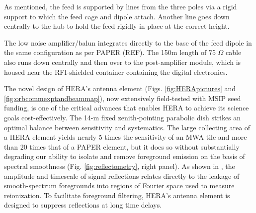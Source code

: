 \documentclass[preprint,11pt]{aastex}
\newcommand{\Mycitet}[1]{\citet{#1}}
\begin{document}
As mentioned, the feed is supported by lines from the three poles via a rigid support to which the feed cage and dipole attach.  Another line goes down centrally to the hub to hold the feed rigidly in place at the correct height.

The low noise amplifier/balun integrates directly to the base of the feed dipole in the same configuration as per PAPER (REF).  The 150m length of 75 $\Omega$ cable also runs down centrally and then over to the post-amplifier module, which is housed near the RFI-shielded container containing the digital electronics.



\noindent The novel design of HERA's antenna element (Figs. \ref{fig:HERApictures} and \ref{fig:orbcommexptandbeammap}), now extensively field-tested with MSIP seed funding, 
is one of the critical advances that enables HERA to achieve its science
goals cost-effectively.  The 14-m fixed zenith-pointing parabolic dish strikes an optimal
balance between sensitivity and systematics.  The large collecting area of a
HERA element yields nearly 5 times the sensitivity of an MWA tile and more
than 20 times that of a PAPER element, but it does so without substantially
degrading our ability to isolate and remove foreground emission on the basis of
spectral smoothness (Fig. \ref{fig:reflectometry}, right panel).  As shown in
\Mycitet{parsons_et_al2012b}, the amplitude and timescale of signal reflections
relates directly to the leakage of smooth-spectrum foregrounds into regions of Fourier space 
used to measure reionization.
To facilitate foreground filtering, HERA's antenna element is designed to suppress reflections at long time delays.
\end{document}
